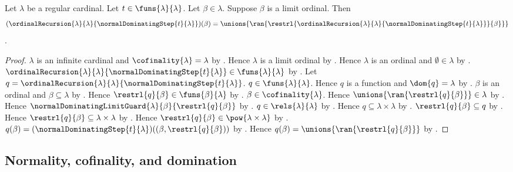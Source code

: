 \begin{proposition}\label{normal_dominating_recursion_limit}
    Let $\lambda$ be a regular cardinal.
    Let $t\in\funs{\lambda}{\lambda}$.
    Let $\beta\in\lambda$.
    Suppose $\beta$ is a limit ordinal.
    Then
    \[
        (\ordinalRecursion{\lambda}{\lambda}
            {\normalDominatingStep{t}{\lambda}})(\beta)
        =\unions{\ran{\restrl{\ordinalRecursion{\lambda}{\lambda}
            {\normalDominatingStep{t}{\lambda}}}{\beta}}}
    \].
\end{proposition}
\begin{proof}
    $\lambda$ is an infinite cardinal and
        $\cofinality{\lambda}=\lambda$ by .
    Hence $\lambda$ is a limit ordinal by
        .
    Hence $\lambda$ is an ordinal and $\emptyset\in\lambda$ by
        .
    $\ordinalRecursion{\lambda}{\lambda}
            {\normalDominatingStep{t}{\lambda}}
        \in\funs{\lambda}{\lambda}$ by
        .
    Let $q=\ordinalRecursion{\lambda}{\lambda}
        {\normalDominatingStep{t}{\lambda}}$.
    $q\in\funs{\lambda}{\lambda}$.
    Hence $q$ is a function and $\dom{q}=\lambda$ by
        .
    $\beta$ is an ordinal and $\beta\subseteq\lambda$ by
        .
    Hence $\restrl{q}{\beta}\in\funs{\beta}{\lambda}$ by
        .
    $\beta\in\cofinality{\lambda}$.
    Hence $\unions{\ran{\restrl{q}{\beta}}}\in\lambda$ by
        .
    Hence $\normalDominatingLimitGuard{\lambda}{\beta}{\restrl{q}{\beta}}$
        by .
    $q\in\rels{\lambda}{\lambda}$ by .
    Hence $q\subseteq\lambda\times\lambda$ by .
    $\restrl{q}{\beta}\subseteq q$ by .
    Hence $\restrl{q}{\beta}\subseteq\lambda\times\lambda$ by
        .
    Hence $\restrl{q}{\beta}\in\pow{\lambda\times\lambda}$ by
        .
    $q(\beta)=(\normalDominatingStep{t}{\lambda})
        ((\beta,\restrl{q}{\beta}))$ by
        .
    Hence $q(\beta)=\unions{\ran{\restrl{q}{\beta}}}$ by
        .
\end{proof}

\subsection{Normality, cofinality, and domination}

